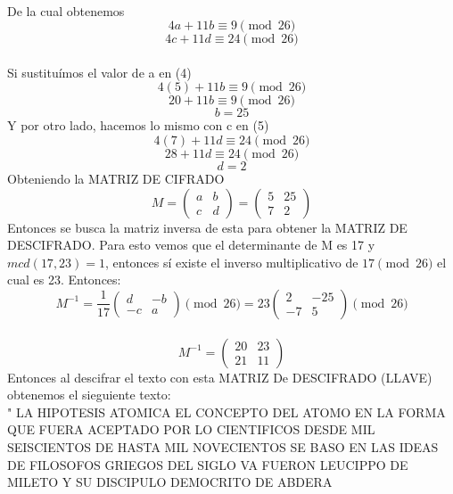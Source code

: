 \documentclass[12pt, letterpaper]{article}
\begin{document}
\\
De la cual obtenemos
\\
\begin{equation}
4a + 11b \equiv 9 \pmod{26}
\end{equation}
\begin{equation}
4c + 11d \equiv 24 \pmod{26}
\end{equation}
\\
Si sustituímos el valor de a en (4)
$$4(5) + 11b \equiv 9 \pmod{26} $$
$$20 + 11b \equiv 9 \pmod{26} $$
$$b=25$$
Y por otro lado, hacemos lo mismo con c en (5)
$$4(7) + 11d \equiv 24 \pmod{26} $$
$$28 + 11d \equiv 24 \pmod{26} $$
$$d=2$$
Obteniendo la MATRIZ DE CIFRADO
$$M = 
\begin{pmatrix}
a & b \\
c & d
\end{pmatrix}
=
\begin{pmatrix}
5 & 25 \\
7 & 2
\end{pmatrix}
$$
Entonces se busca la matriz inversa de esta para obtener la MATRIZ DE DESCIFRADO.
Para esto vemos que el determinante de M es 17 y  $mcd(17,23)=1$, entonces sí existe el inverso multiplicativo de $17 \pmod{26}$ el cual es 23.
Entonces:
$$
M^{-1} = \frac{1}{17} 
\begin{pmatrix}
d & -b \\
-c & a
\end{pmatrix}
\pmod{26}
=
23
\begin{pmatrix}
2 & -25 \\
-7 & 5
\end{pmatrix}
\pmod{26}
$$
\\
$$
M^{-1} =
\begin{pmatrix}
20 & 23 \\
21 & 11
\end{pmatrix}
$$
Entonces al descifrar el texto con esta MATRIZ De DESCIFRADO (LLAVE) obtenemos el sieguiente texto:\\
"
LA HIPOTESIS ATOMICA EL CONCEPTO DEL ATOMO EN LA FORMA QUE FUERA ACEPTADO POR LO CIENTIFICOS DESDE MIL SEISCIENTOS DE HASTA MIL NOVECIENTOS SE BASO EN LAS IDEAS DE FILOSOFOS GRIEGOS DEL SIGLO VA FUERON LEUCIPPO DE MILETO Y SU DISCIPULO DEMOCRITO DE ABDERA
\end{document}
